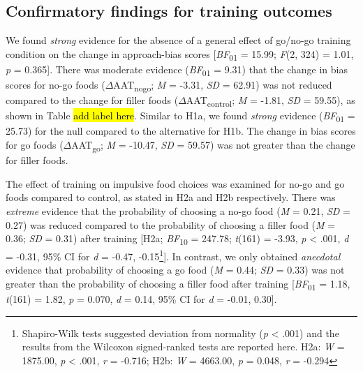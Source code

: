 \documentclass[man,floatsintext]{apa6}
\let\rmarkdownfootnote\footnote%
\def\footnote{\protect\rmarkdownfootnote}
\begin{document}
\hypertarget{confirmatory-findings-for-training-outcomes}{%
\subsection{Confirmatory findings for training outcomes}\label{confirmatory-findings-for-training-outcomes}}

\par

We found \emph{strong} evidence for the absence of a general effect of go/no-go training condition on the change in approach-bias scores {[}\emph{BF}\textsubscript{01} = 15.99; \emph{F}(2, 324) = 1.01, \emph{p} = 0.365{]}. There was moderate evidence (\emph{BF}\textsubscript{01} = 9.31) that the change in bias scores for no-go foods (\(\Delta\)AAT\textsubscript{nogo}; \emph{M} = -3.31, \emph{SD} = 62.91) was not reduced compared to the change for filler foods (\(\Delta\)AAT\textsubscript{control}; \emph{M} = -1.81, \emph{SD} = 59.55), as shown in Table \hl{add label here}. Similar to H1a, we found \emph{strong} evidence (\emph{BF}\textsubscript{01} = 25.73) for the null compared to the alternative for H1b. The change in bias scores for go foods (\(\Delta\)AAT\textsubscript{go}; \emph{M} = -10.47, \emph{SD} = 59.57) was not greater than the change for filler foods.

\par

The effect of training on impulsive food choices was examined for no-go and go foods compared to control, as stated in H2a and H2b respectively. There was \emph{extreme} evidence that the probability of choosing a no-go food (\emph{M} = 0.21, \emph{SD} = 0.27) was reduced compared to the probability of choosing a filler food (\emph{M} = 0.36; \emph{SD} = 0.31) after training {[}H2a; \emph{BF}\textsubscript{10} = 247.78; \emph{t}(161) = -3.93, \emph{p} \textless{} .001, \emph{d} = -0.31, 95\% CI for \emph{d} = -0.47, -0.15\footnote{Shapiro-Wilk tests suggested deviation from normality (\textit{p} < .001) and the results from the Wilcoxon signed-ranked tests are reported here. H2a: \textit{W} = 1875.00, \textit{p} < .001, \textit{r} = -0.716; H2b: \textit{W} = 4663.00, \textit{p} = 0.048, \textit{r} = -0.294}{]}. In contrast, we only obtained \emph{anecdotal} evidence that probability of choosing a go food (\emph{M} = 0.44; \emph{SD} = 0.33) was not greater than the probability of choosing a filler food after training {[}\emph{BF}\textsubscript{01} = 1.18, \emph{t}(161) = 1.82, \emph{p} = 0.070, \emph{d} = 0.14, 95\% CI for \emph{d} = -0.01, 0.30{]}.
\end{document}
